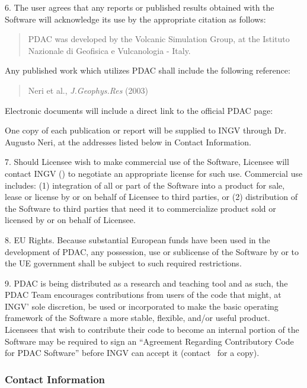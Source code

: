6. The user agrees that any reports or published results obtained 
with the Software will acknowledge its use by the appropriate citation 
as follows: 

\begin{quote}
 PDAC was developed by the Volcanic Simulation Group,
 at the Istituto Nazionale di Geofisica e Vulcanologia - Italy.
\end{quote}

Any published work which utilizes PDAC shall include the following reference: 

\begin{quote}
  Neri et al., {\em J.Geophys.Res} (2003)
\end{quote}

Electronic documents will include a direct link to the official PDAC page:

\begin{quote}
\PDACURL
\end{quote}

One copy of each publication or report will be supplied to INGV 
through Dr. Augusto Neri, at the addresses listed below in Contact 
Information.

7. Should Licensee wish to make commercial use of the Software, Licensee 
will contact INGV (\PDACADDRESS) to negotiate an appropriate 
license for such use. Commercial use includes: (1) integration of all 
or part of the Software into a product for sale, lease or license by or 
on behalf of Licensee to third parties, or (2) distribution of the 
Software to third parties that need it to commercialize product sold or 
licensed by or on behalf of Licensee.

8. EU Rights. Because substantial European funds have been 
used in the development of PDAC, any possession, use or sublicense of 
the Software by or to the UE government shall be subject 
to such required restrictions.

9. PDAC is being distributed as a research and teaching tool and as such, 
the PDAC Team encourages contributions from users of the code that might, at 
INGV' sole discretion, be used or incorporated to make the basic 
operating framework of the Software a more stable, flexible, and/or 
useful product. Licensees that wish to contribute their code to become 
an internal portion of the Software may be required to sign an 
``Agreement Regarding Contributory Code for PDAC Software''
before INGV can accept it (contact \PDACADDRESS\  for a copy).

\newpage
\subsubsection*{Contact Information}

